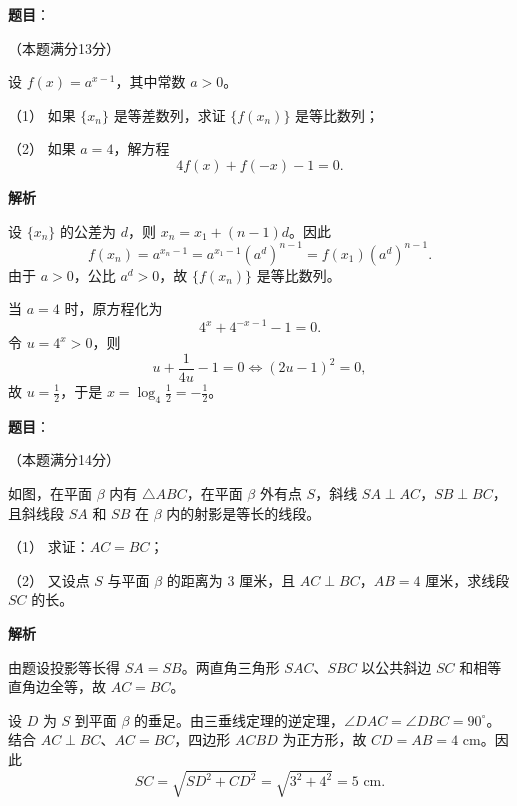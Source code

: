 \begin{answer}

\textbf{题目}：

（本题满分13分）

设 $f(x)=a^{x-1}$，其中常数 $a>0$。

（1） 如果 $\{x_n\}$ 是等差数列，求证 $\{f(x_n)\}$ 是等比数列；

（2） 如果 $a=4$，解方程
\nopagebreak[4]
\[
4f(x)+f(-x)-1=0.
\]

\textbf{解析}


设 $\{x_n\}$ 的公差为 $d$，则 $x_n=x_1+(n-1)d$。因此
\nopagebreak[4]
\[
f(x_n)=a^{x_n-1}=a^{x_1-1}(a^d)^{n-1}=f(x_1)(a^d)^{n-1}.
\]
由于 $a>0$，公比 $a^d>0$，故 $\{f(x_n)\}$ 是等比数列。


当 $a=4$ 时，原方程化为
\nopagebreak[4]
\[
4^x+4^{-x-1}-1=0.
\]
令 $u=4^x>0$，则
\nopagebreak[4]
\[
u+\frac1{4u}-1=0\iff (2u-1)^2=0,
\]
故 $u=\frac12$，于是 $x=\log_4\frac12=-\frac12$。



\end{answer}
\begin{answer}

\textbf{题目}：

（本题满分14分）

如图，在平面 $\beta$ 内有 $\triangle ABC$，在平面 $\beta$ 外有点 $S$，斜线 $SA\perp AC$，$SB\perp BC$，且斜线段 $SA$ 和 $SB$ 在 $\beta$ 内的射影是等长的线段。
\nopagebreak[4]
\begin{center}\end{center}
\nopagebreak[4]
（1） 求证：$AC=BC$；

（2） 又设点 $S$ 与平面 $\beta$ 的距离为 $3$ 厘米，且 $AC\perp BC$，$AB=4$ 厘米，求线段 $SC$ 的长。

\textbf{解析}


由题设投影等长得 $SA=SB$。两直角三角形 $SAC$、$SBC$ 以公共斜边 $SC$ 和相等直角边全等，故 $AC=BC$。


设 $D$ 为 $S$ 到平面 $\beta$ 的垂足。由三垂线定理的逆定理，$\angle DAC=\angle DBC=90^\circ$。结合 $AC\perp BC$、$AC=BC$，四边形 $ACBD$ 为正方形，故 $CD=AB=4\text{ cm}$。因此
\nopagebreak[4]
\[
SC=\sqrt{SD^2+CD^2}=\sqrt{3^2+4^2}=5\text{ cm}.
\]
\nopagebreak[4]
\begin{center}\end{center}
\nopagebreak[4]


\end{answer}
